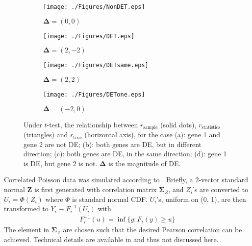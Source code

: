 \documentclass[12pt, a4paper]{article}
\begin{document}
	\begin{figure}[!ht]
		\centering
		\begin{subfigure}{.5\textwidth}
			\centering
			\texttt{[image: ./Figures/NonDET.eps]}
			\captionsetup{justification=centering}
			\caption{$\bm \Delta= (0, 0)$}
		\end{subfigure}%
		\begin{subfigure}{.5\textwidth}
			\centering
			\texttt{[image: ./Figures/DET.eps]}
			\captionsetup{justification=centering}
			\caption{$\bm \Delta= (2, -2)$}
		\end{subfigure}
		\newline
		\newline
		\centering
		\begin{subfigure}{.5\textwidth}
			\centering
			\texttt{[image: ./Figures/DETsame.eps]}
			\captionsetup{justification=centering}
			\caption{$\bm \Delta= (2, 2)$}
		\end{subfigure}%
		\begin{subfigure}{.5\textwidth}
			\centering
			\texttt{[image: ./Figures/DETone.eps]}
			\captionsetup{justification=centering}
			\caption{$\bm \Delta= (-2, 0)$ }
		\end{subfigure}
		\caption{Under $t$-test, the relationship between $r_{\text{sample}}$ (solid dots), $
			r_\text{statistics}$ (triangles) and $r_{\text{true}}$ (horizontal axis), for the case (a): gene 1
			and gene 2 are not DE; (b): both genes are DE, but in different direction; (c): both genes are DE,
			in the same direction; (d): gene 1 is DE, but gene 2 is not. $\bm \Delta$ is the magnitude of DE.}
		\label{figureT}
	\end{figure}
	
	
	
	Correlated Poisson data was simulated according to \cite{madsen2013simulating}. Briefly, a 2-vector
	standard normal $\bm Z$ is first generated with correlation matrix $\bm \Sigma_Z$, and $Z_i$'s are
	converted to $U_i= \Phi(Z_i)$ where $\Phi$ is standard normal CDF. $U_i$'s, uniform on (0, 1), are
	then transformed to $Y_i \equiv F_i^{-1}(U_i)$ with 
	\begin{align}\label{inverseSim}
		F_i^{-1}(u) = \inf \{y: F_i(y)\geq u\}
	\end{align}
	The element in $\bm \Sigma_Z$ are chosen such that the desired Pearson correlation can be achieved.
	Technical details are available in \cite{madsen2013simulating} and thus not discussed here. 
	
\end{document}
